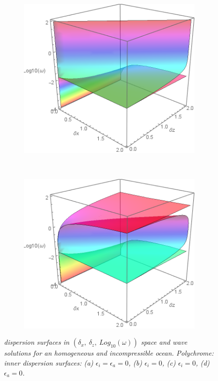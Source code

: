 \documentclass[a4paper,11pt]{article}
\begin{document}
\begin{figure}[!h]
\begin{subfigure}{0.36\linewidth}
		\caption{}
	\end{subfigure}
	~
	\centering		
	\begin{subfigure}{0.36\linewidth}
		\includegraphics[width=1\linewidth]{FIGURES/Disp_Full_inner_01.png}
		\caption{}
	\end{subfigure}
	~
	\centering
	\begin{subfigure}{0.36\linewidth}
		\includegraphics[width=1\linewidth]{FIGURES/Disp_Full_inner_11.png}
		\caption{}
	\end{subfigure}

	\caption{\textit{dispersion surfaces in $(\delta_x,\ \delta_z,\ Log_{10}(\omega))$ space and wave solutions for an homogeneous and incompressible ocean. Polychrome: inner dispersion surfaces:
	(a) $\epsilon_i=\epsilon_a=0$,
	(b) $\epsilon_i=0$,
	(c) $\epsilon_i=0$, 
	(d) $\epsilon_a=0$.}}
	\label{FigFullHomogeneous}
\end{figure}
\end{document}
